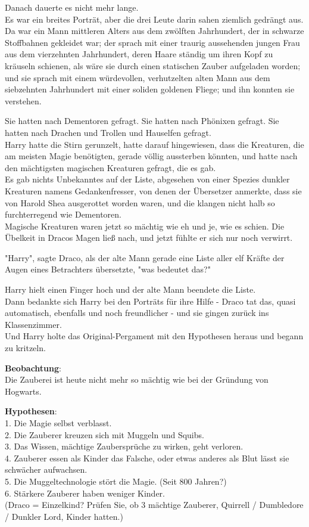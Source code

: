 {Danach dauerte es nicht mehr lange.\\ Es war ein breites Porträt, aber die drei Leute darin sahen ziemlich gedrängt aus. Da war ein Mann mittleren Alters aus dem zwölften Jahrhundert, der in schwarze Stoffbahnen gekleidet war; der sprach mit einer traurig aussehenden jungen Frau aus dem vierzehnten Jahrhundert, deren Haare ständig um ihren Kopf zu kräuseln schienen, als wäre sie durch einen statischen Zauber aufgeladen worden; und sie sprach mit einem würdevollen, verhutzelten alten Mann aus dem siebzehnten Jahrhundert mit einer soliden goldenen Fliege; und ihn konnten sie verstehen.

Sie hatten nach Dementoren gefragt. Sie hatten nach Phönixen gefragt. Sie hatten nach Drachen und Trollen und Hauselfen gefragt.\\ Harry hatte die Stirn gerunzelt, hatte darauf hingewiesen, dass die Kreaturen, die am meisten Magie benötigten, gerade völlig aussterben könnten, und hatte nach den mächtigsten magischen Kreaturen gefragt, die es gab.\\ Es gab nichts Unbekanntes auf der Liste, abgesehen von einer Spezies dunkler Kreaturen namens Gedankenfresser, von denen der Übersetzer anmerkte, dass sie von Harold Shea ausgerottet worden waren, und die klangen nicht halb so furchterregend wie Dementoren.\\ Magische Kreaturen waren jetzt so mächtig wie eh und je, wie es schien. Die Übelkeit in Dracos Magen ließ nach, und jetzt fühlte er sich nur noch verwirrt.

"Harry", sagte Draco, als der alte Mann gerade eine Liste aller elf Kräfte der Augen eines Betrachters übersetzte, "was bedeutet das?"

Harry hielt einen Finger hoch und der alte Mann beendete die Liste.\\ Dann bedankte sich Harry bei den Porträts für ihre Hilfe - Draco tat das, quasi automatisch, ebenfalls und noch freundlicher - und sie gingen zurück ins Klassenzimmer.\\ Und Harry holte das Original-Pergament mit den Hypothesen heraus und begann zu kritzeln.

\textbf{Beobachtung}:\\ Die Zauberei ist heute nicht mehr so mächtig wie bei der Gründung von Hogwarts.

\textbf{Hypothesen}:\\ 1. Die Magie selbst verblasst.\\ 2. Die Zauberer kreuzen sich mit Muggeln und Squibs.\\ 3. Das Wissen, mächtige Zaubersprüche zu wirken, geht verloren.\\ 4. Zauberer essen als Kinder das Falsche, oder etwas anderes als Blut lässt sie schwächer aufwachsen.\\ 5. Die Muggeltechnologie stört die Magie. (Seit 800 Jahren?)\\ 6. Stärkere Zauberer haben weniger Kinder.\\ (Draco = Einzelkind? Prüfen Sie, ob 3 mächtige Zauberer, Quirrell / Dumbledore / Dunkler Lord, Kinder hatten.)

}
